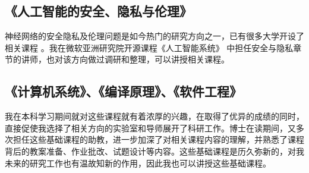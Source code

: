 \documentclass[12pt]{article}
\begin{document}
\subsection{《人工智能的安全、隐私与伦理》}
神经网络的安全隐私及伦理问题是如今热门的研究方向之一，已有很多大学开设了相关课程 \cite{ucb:trustworthy,ucb:fairness}。我在微软亚洲研究院开源课程《人工智能系统》 \cite{microsoft:ai-system}中担任安全与隐私章节的讲师，也对该方向做过调研和整理，可以讲授相关课程。

\subsection{《计算机系统》、《编译原理》、《软件工程》}
我在本科学习期间就对这些课程就有着浓厚的兴趣，在取得了优异的成绩的同时，直接促使我选择了相关方向的实验室和导师展开了科研工作。博士在读期间，又多次担任这些基础课程的助教，进一步加深了对相关课程内容的理解，并熟悉了课程背后的教案准备、作业批改、试题设计等内容。这些基础课程是历久弥新的，对我未来的研究工作也有温故知新的作用，因此我也可以讲授这些基础课程。



{


}
\end{document}
